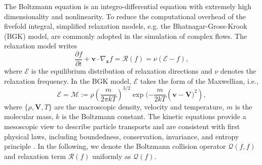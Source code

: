 \documentclass[preprint,3p,12pt,sort&compress]{elsarticle}
\begin{document}
The Boltzmann equation is an integro-differential equation with extremely high dimensionality and nonlinearity.
To reduce the computational overhead of the fivefold integral, simplified relaxation models, e.g. the Bhatnagar-Gross-Krook (BGK) model, are commonly adopted in the simulation of complex flows.
The relaxation model writes
\begin{equation}
    \frac{\partial f}{\partial t} + \mathbf v \cdot \nabla_\mathbf x f = \mathcal R(f) = \nu (\mathcal E - f),
\label{eq:bgk}
\end{equation}
where $\mathcal E$ is the equilibrium distribution of relaxation directions and $\nu$ denotes the relaxation frequency.
In the BGK model, $\mathcal E$ takes the form of the Maxwellian, i.e.,
\begin{equation}
    \mathcal E = \mathcal M := \rho\left(\frac{m}{2\pi k T}\right)^{3/2} \exp(-\frac{m}{2kT} \left(\mathbf v - \mathbf V)^2 \right),
\end{equation}
where $\{\rho,\mathbf V,T\}$ are the macroscopic density, velocity and temperature, $m$ is the molecular mass, $k$ is the Boltzmann constant.
The kinetic equations provide a mesoscopic view to describe particle transports and are consistent with first physical laws, including boundedness, conservation, invariance, and entropy principle \cite{alldredge2019regularized,xiao2023relaxnet}.
In the following, we denote the Boltzmann collision operator $\mathcal Q(f,f)$ and relaxation term $\mathcal R(f)$ uniformly as $\mathcal Q(f)$.
\end{document}
